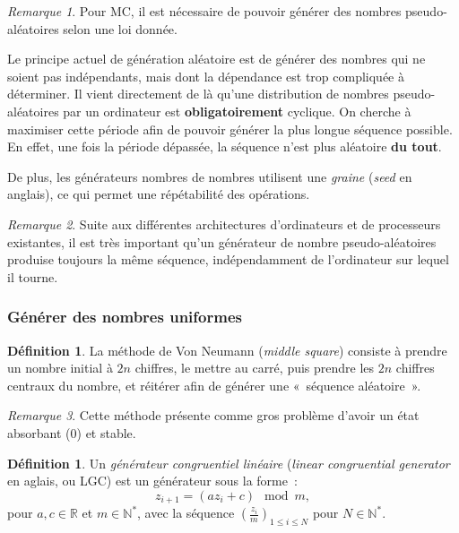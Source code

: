 \documentclass{article}
\theoremstyle{definition}
\newtheorem{déf}[thm]{Définition}
\theoremstyle{remark}
\newtheorem*{rmq}{Remarque}
\newcommand{\N}{\mathbb N}
\newcommand{\R}{\mathbb R}
\begin{document}
	\begin{rmq} Pour MC, il est nécessaire de pouvoir générer des nombres pseudo-aléatoires selon une loi donnée.

	Le principe actuel de génération aléatoire est de générer des nombres qui ne soient pas indépendants, mais dont la dépendance est trop compliquée à déterminer.
	Il vient directement de là qu'une distribution de nombres pseudo-aléatoires par un ordinateur est \textbf{obligatoirement} cyclique. On cherche à maximiser
	cette période afin de pouvoir générer la plus longue séquence possible. En effet, une fois la période dépassée, la séquence n'est plus aléatoire
	\textbf{du tout}.

	De plus, les générateurs nombres de nombres utilisent une \textit{graine} (\textit{seed} en anglais), ce qui permet une répétabilité des opérations.
	\end{rmq}

	\begin{rmq} Suite aux différentes architectures d'ordinateurs et de processeurs existantes, il est très important qu'un générateur de nombre pseudo-aléatoires
	produise toujours la même séquence, indépendamment de l'ordinateur sur lequel il tourne.
	\end{rmq}

		\subsubsection{Générer des nombres uniformes}

	\begin{déf} La méthode de Von Neumann (\textit{middle square}) consiste à prendre un nombre initial à $2n$ chiffres, le mettre au carré, puis prendre les
	$2n$ chiffres centraux du nombre, et réitérer afin de générer une «~séquence aléatoire~».
	\end{déf}

	\begin{rmq} Cette méthode présente comme gros problème d'avoir un état absorbant ($0$) et stable.
	\end{rmq}

	\begin{déf} Un \textit{générateur congruentiel linéaire} (\textit{linear congruential generator} en aglais, ou LGC) est un générateur sous la forme~:
	\[z_{i+1} = \left(az_i + c\right) \mod m,\]
	pour $a, c \in \R$ et $m \in \N^*$, avec la séquence $\left(\frac {z_i}m\right)_{1 \leq i \leq N}$ pour $N \in \N^*$.
	\end{déf}
\end{document}
